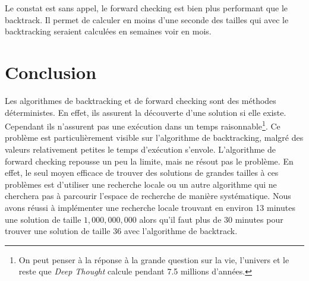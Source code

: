 \documentclass[10pt,a4paper]{report}
\begin{document}
Le constat est sans appel, le forward checking est bien plus performant que le backtrack. Il permet de calculer en moins d'une seconde des tailles qui avec le backtracking seraient calculées en semaines voir en mois.

\section{Conclusion}

Les algorithmes de backtracking et de forward checking sont des méthodes déterministes. En effet, ils assurent la découverte d'une solution si elle existe.
Cependant ils n'assurent pas une exécution dans un temps raisonnable\footnote{On peut penser à la réponse à la grande question sur la vie, l'univers et le reste que \textit{Deep Thought} calcule pendant 7.5 millions d'années.}.
Ce problème est particulièrement visible sur l'algorithme de backtracking, malgré des valeurs relativement petites le temps d'exécution s'envole.
L'algorithme de forward checking repousse un peu la limite, mais ne résout pas le problème.
En effet, le seul moyen efficace de trouver des solutions de grandes tailles à ces problèmes est d'utiliser une recherche locale ou un autre algorithme qui ne cherchera pas à parcourir l'espace de recherche de manière systématique.
Nous avons réussi à implémenter une recherche locale trouvant en environ 13 minutes une solution de taille $1,000,000,000$ alors qu'il faut plus de 30 minutes pour trouver une solution de taille 36 avec l'algorithme de backtrack.
\end{document}

